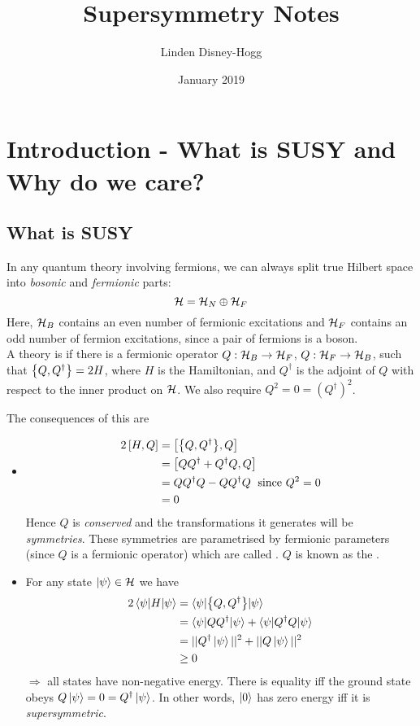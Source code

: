 \documentclass{article}
\title{Supersymmetry Notes}
\author{Linden Disney-Hogg}
\date{January 2019}
\begin{document}
\maketitle
\tableofcontents

\section{Introduction - What is SUSY and Why do we care?}

\subsection{What is SUSY}
In any quantum theory involving fermions, we can always split true Hilbert space into \emph{bosonic} and \emph{fermionic} parts:
\[
\mc{H} = \mc{H}_N \oplus \mc{H}_F
\]
Here, $\mc{H}_B$ contains an even number of fermionic excitations and $\mc{H}_F$ contains an odd number of fermion excitations, since a pair of fermions is a boson. \\
A theory is  if there is a fermionic operator $Q:\mc{H}_B \to \mc{H}_F$, $Q:\mc{H}_F \to \mc{H}_B$, such that $\acomm[Q]{Q^\dagger} = 2H$, where $H$ is the Hamiltonian, and $Q^\dagger$ is the adjoint of $Q$ with respect to the inner product on $\mc{H}$. We also require $Q^2 = 0 = (Q^\dagger)^2$. 

The consequences of this are 
\begin{itemize}
    \item \begin{align*}
    2\comm[H]{Q} &= \comm[ {\acomm[Q]{Q^\dagger}} ]{Q} \\ 
    &= \comm[QQ^\dagger + Q^\dagger Q]{Q} \\ 
    &= QQ^\dagger Q - QQ^\dagger Q \; \text{ since }Q^2=0 \\
    &= 0
\end{align*}
Hence $Q$ is \emph{conserved} and the transformations it generates will be \emph{symmetries}. These symmetries are parametrised by fermionic parameters (since $Q$ is a fermionic operator) which are called . $Q$ is known as the .
\item For any state $\ket{\psi}\in\mc{H}$ we have 
\begin{align*}
    2\braket{\psi|H|\psi} &= \braket{\psi| {\acomm[Q]{Q^\dagger}} | \psi} \\
    &= \braket{\psi | QQ^\dagger | \psi} + \braket{\psi | Q^\dagger Q | \psi} \\
    &= ||Q^\dagger \ket{\psi}||^2+||Q\ket{\psi}||^2 \\
    &\geq 0
\end{align*}
$\Rightarrow$ all states have non-negative energy. There is equality iff the ground state obeys $Q\ket{\psi}=0=Q^\dagger \ket{\psi}$. In other words, $\ket{0}$ has zero energy iff it is \emph{supersymmetric}.
\end{itemize}
\end{document}
